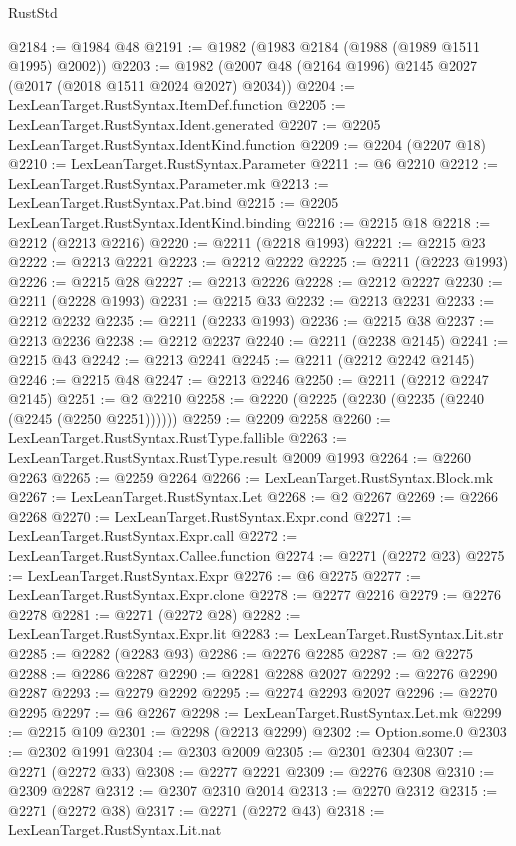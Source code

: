 \begin{lexlean}{RustStd}
\begin{coremodule}
{\begin{coremodule}
{{{{{{{{{{{{{{{{{{{{{{{{{{{{{{{{{{{{{{{{{{{{{{{{{{{{{{@2184 := @1984 @48
@2191 := @1982 (@1983 @2184 (@1988 (@1989 @1511 @1995) @2002))
@2203 := @1982 (@2007 @48 (@2164 @1996) @2145 @2027 (@2017 (@2018 @1511 @2024 @2027) @2034))
@2204 := LexLeanTarget.RustSyntax.ItemDef.function
@2205 := LexLeanTarget.RustSyntax.Ident.generated
@2207 := @2205 LexLeanTarget.RustSyntax.IdentKind.function
@2209 := @2204 (@2207 @18)
@2210 := LexLeanTarget.RustSyntax.Parameter
@2211 := @6 @2210
@2212 := LexLeanTarget.RustSyntax.Parameter.mk
@2213 := LexLeanTarget.RustSyntax.Pat.bind
@2215 := @2205 LexLeanTarget.RustSyntax.IdentKind.binding
@2216 := @2215 @18
@2218 := @2212 (@2213 @2216)
@2220 := @2211 (@2218 @1993)
@2221 := @2215 @23
@2222 := @2213 @2221
@2223 := @2212 @2222
@2225 := @2211 (@2223 @1993)
@2226 := @2215 @28
@2227 := @2213 @2226
@2228 := @2212 @2227
@2230 := @2211 (@2228 @1993)
@2231 := @2215 @33
@2232 := @2213 @2231
@2233 := @2212 @2232
@2235 := @2211 (@2233 @1993)
@2236 := @2215 @38
@2237 := @2213 @2236
@2238 := @2212 @2237
@2240 := @2211 (@2238 @2145)
@2241 := @2215 @43
@2242 := @2213 @2241
@2245 := @2211 (@2212 @2242 @2145)
@2246 := @2215 @48
@2247 := @2213 @2246
@2250 := @2211 (@2212 @2247 @2145)
@2251 := @2 @2210
@2258 := @2220 (@2225 (@2230 (@2235 (@2240 (@2245 (@2250 @2251))))))
@2259 := @2209 @2258
@2260 := LexLeanTarget.RustSyntax.RustType.fallible
@2263 := LexLeanTarget.RustSyntax.RustType.result @2009 @1993
@2264 := @2260 @2263
@2265 := @2259 @2264
@2266 := LexLeanTarget.RustSyntax.Block.mk
@2267 := LexLeanTarget.RustSyntax.Let
@2268 := @2 @2267
@2269 := @2266 @2268
@2270 := LexLeanTarget.RustSyntax.Expr.cond
@2271 := LexLeanTarget.RustSyntax.Expr.call
@2272 := LexLeanTarget.RustSyntax.Callee.function
@2274 := @2271 (@2272 @23)
@2275 := LexLeanTarget.RustSyntax.Expr
@2276 := @6 @2275
@2277 := LexLeanTarget.RustSyntax.Expr.clone
@2278 := @2277 @2216
@2279 := @2276 @2278
@2281 := @2271 (@2272 @28)
@2282 := LexLeanTarget.RustSyntax.Expr.lit
@2283 := LexLeanTarget.RustSyntax.Lit.str
@2285 := @2282 (@2283 @93)
@2286 := @2276 @2285
@2287 := @2 @2275
@2288 := @2286 @2287
@2290 := @2281 @2288 @2027
@2292 := @2276 @2290 @2287
@2293 := @2279 @2292
@2295 := @2274 @2293 @2027
@2296 := @2270 @2295
@2297 := @6 @2267
@2298 := LexLeanTarget.RustSyntax.Let.mk
@2299 := @2215 @109
@2301 := @2298 (@2213 @2299)
@2302 := Option.some.{0}
@2303 := @2302 @1991
@2304 := @2303 @2009
@2305 := @2301 @2304
@2307 := @2271 (@2272 @33)
@2308 := @2277 @2221
@2309 := @2276 @2308
@2310 := @2309 @2287
@2312 := @2307 @2310 @2014
@2313 := @2270 @2312
@2315 := @2271 (@2272 @38)
@2317 := @2271 (@2272 @43)
@2318 := LexLeanTarget.RustSyntax.Lit.nat
}}}}}}}}}}}}}}}}}}}}}}}}}}}}}}}}}}}}}}}}}}}}}}}}}}}}}}
\end{coremodule}}
\end{coremodule}
\end{lexlean}

